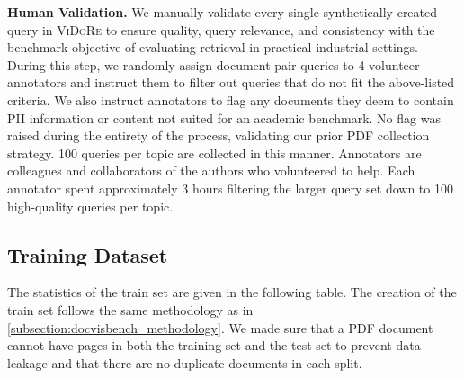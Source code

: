 

\noindent\textbf{Human Validation.} We manually validate every single synthetically created query in \textsc{ViDoRe} to ensure quality, query relevance, and consistency with the benchmark objective of evaluating retrieval in practical industrial settings. During this step, we randomly assign document-pair queries to 4 volunteer annotators and instruct them to filter out queries that do not fit the above-listed criteria. We also instruct annotators to flag any documents they deem to contain PII information or content not suited for an academic benchmark. No flag was raised during the entirety of the process, validating our prior PDF collection strategy. 100 queries per topic are collected in this manner. Annotators are colleagues and collaborators of the authors who volunteered to help. Each annotator spent approximately 3 hours filtering the larger query set down to 100 high-quality queries per topic.

\subsection{Training Dataset}
\label{subsection:training_dataset}
The statistics of the train set are given in the following table. The creation of the train set follows the same methodology as in \autoref{subsection:docvisbench_methodology}. We made sure that a PDF document cannot have pages in both the training set and the test set to prevent data leakage and that there are no duplicate documents in each split.


